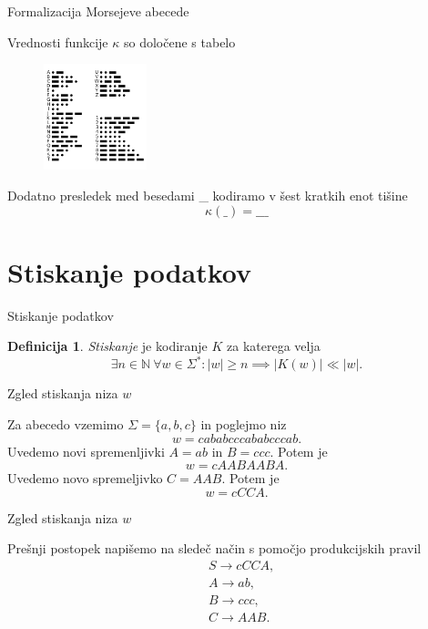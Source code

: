 \documentclass{beamer}
\newcommand{\N}{\mathbb{N}}
\theoremstyle{definition} %
\newtheorem{definicija}{Definicija}[section]
\theoremstyle{plain} %
\begin{document}
\begin{frame}{Formalizacija Morsejeve abecede}
    
    Vrednosti funkcije $ \kappa $ so določene s
    tabelo
    \begin{figure}[h]
        \centering
        \includegraphics[width=3cm]{International_Morse_Code.svg.png}
    \end{figure}
    Dodatno presledek med besedami \_  kodiramo v šest kratkih enot tišine 
    \[
        \kappa(\_) = \_\_\_
    \]

\end{frame}

\section*{Stiskanje podatkov}

\begin{frame}{Stiskanje podatkov}
    
    \begin{definicija}
    
        \textit{Stiskanje} je kodiranje $ K $ za katerega velja 
        \[ 
        \exists n \in \N \ \forall w \in \Sigma^* \colon |w| \geq n \implies
        \left\lvert K(w)\right\rvert \ll \left\lvert w \right\rvert.
        \]
    
    \end{definicija}

\end{frame}

\begin{frame}{Zgled stiskanja niza $ w $}

    Za abecedo vzemimo $ \Sigma = \{ a,b,c \} $ in poglejmo niz
    \[
        w = cababcccababcccab.
    \]
    \pause
    Uvedemo novi spremenljivki $ A = ab $ in $ B = ccc $.
    \pause
    Potem je
    \[
        w = cAABAABA.
    \]
    \pause
    Uvedemo novo spremeljivko $ C = AAB $.
    \pause
    Potem je    
    \[
        w = cCCA.
    \]

\end{frame}

\begin{frame}{Zgled stiskanja niza $ w $}
    
    Prešnji postopek napišemo na sledeč način s pomočjo produkcijskih pravil
    \begin{align*}
        & S  \rightarrow  cCCA, \\
        & A  \rightarrow  ab, \\
        & B  \rightarrow  ccc, \\
        & C  \rightarrow  AAB.
    \end{align*}

\end{frame}
\end{document}
